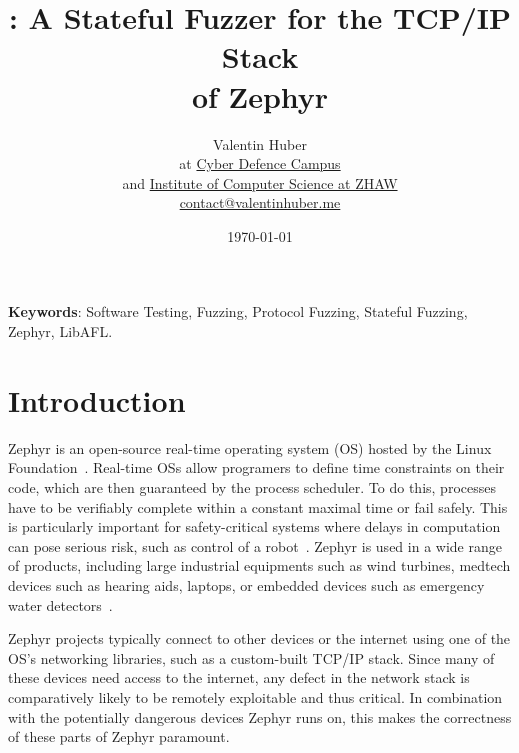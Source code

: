 \documentclass[twocolumn]{article}
\title{%
    \vspace{50px}%
    \Huge \proj : A Stateful Fuzzer for the TCP/IP Stack\\of Zephyr
    \vspace{250px}%
}
\author{%
    Valentin Huber\vspace{5px}\\%
    \small at \href{https://www.cydcampus.admin.ch/}{Cyber Defence Campus}\\%
    \small and \href{https://www.zhaw.ch/en/engineering/institutes-centres/init/}{Institute of Computer Science at ZHAW}\\%
    \small \href{mailto://contact@valentinhuber.me}{contact@valentinhuber.me}%
    \vspace{10px}
    \todo{@Peter I need the title page template}
}
\date{\today}
\let\savedCite=\cite
\renewcommand{\cite}{\unskip~\savedCite}
\begin{document}
\maketitle

\clearpage\newpage
\onecolumn
\begin{center}
  \begin{minipage}{0.8\textwidth}
    \vspace{70px}
    \begin{abstract}
      \lipsum[1]\lipsum[2]\lipsum[3]
    \end{abstract}
  \end{minipage}
  \vspace{70px}

  \begin{minipage}{0.7\textwidth}
    \textbf{Keywords}: Software Testing, Fuzzing, Protocol Fuzzing, Stateful Fuzzing, Zephyr, LibAFL.
  \end{minipage}
\end{center}

\clearpage\newpage
\onecolumn

\tableofcontents
\clearpage\newpage
\twocolumn
{}


\section{Introduction}
\label{Introduction}

Zephyr is an open-source real-time operating system (OS) hosted by the Linux Foundation\cite{ZephyrAbout}. Real-time OSs allow programers to define time constraints on their code, which are then guaranteed by the process scheduler. To do this, processes have to be verifiably complete within a constant maximal time or fail safely. This is particularly important for safety-critical systems where delays in computation can pose serious risk, such as control of a robot\cite{RTOSWiki}. Zephyr is used in a wide range of products, including large industrial equipments such as wind turbines, medtech devices such as hearing aids, laptops, or embedded devices such as emergency water detectors\cite{ZephyrUsedIn}.

Zephyr projects typically connect to other devices or the internet using one of the OS's networking libraries, such as a custom-built TCP/IP stack. Since many of these devices need access to the internet, any defect in the network stack is comparatively likely to be remotely exploitable and thus critical. In combination with the potentially dangerous devices Zephyr runs on, this makes the correctness of these parts of Zephyr paramount.
\end{document}
